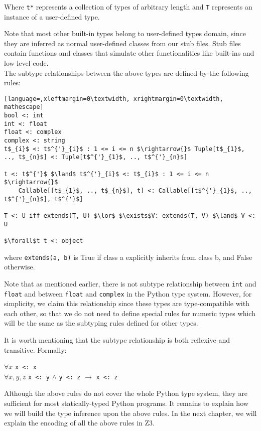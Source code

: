 Where \lstinline|t*| represents a collection of types of arbitrary length and \lstinline|T| represents an instance of a user-defined type.

Note that most other built-in types belong to user-defined types domain, since they are inferred as normal user-defined classes from our stub files. Stub files contain functions and classes that simulate other functionalities like built-ins and low level code. \\

The subtype relationships between the above types are defined by the following rules:

\begin{lstlisting}[language=,xleftmargin=0\textwidth, xrightmargin=0\textwidth, mathescape]
bool <: int
int <: float
float <: complex
complex <: string
t$_{i}$ <: t$^{'}_{i}$ : 1 <= i <= n $\rightarrow{}$ Tuple[t$_{1}$, .., t$_{n}$] <: Tuple[t$^{'}_{1}$, .., t$^{'}_{n}$]

t <: t$^{'}$ $\land$ t$^{'}_{i}$ <: t$_{i}$ : 1 <= i <= n $\rightarrow{}$
	Callable[[t$_{1}$, .., t$_{n}$], t] <: Callable[[t$^{'}_{1}$, .., t$^{'}_{n}$], t$^{'}$]
	
T <: U iff extends(T, U) $\lor$ $\exists$V: extends(T, V) $\land$ V <: U 
	
$\forall$t t <: object
\end{lstlisting}

where \lstinline|extends(a, b)| is True if class a explicitly inherits from class b,
and False otherwise.

Note that as mentioned earlier, there is not subtype relationship between \lstinline|int| and \lstinline|float| and between \lstinline|float| and \lstinline|complex| in the Python type system. However, for simplicity, we claim this relationship since these types are type-compatible with each other, so that we do not need to define special rules for numeric types which will be the same as the subtyping rules defined for other types.

It is worth mentioning that the subtype relationship is both reflexive and transitive. Formally:


\begin{center}
	$\forall x$ \lstinline|x <: x| \\
	$\forall x,y,z$ \lstinline|x <: y| $\land$ \lstinline|y <: z| $\rightarrow$ \lstinline|x <: z|
\end{center}

Although the above rules do not cover the whole Python type system, they are sufficient for most statically-typed Python programs. It remains to explain how we will build the type inference upon the above rules. In the next chapter, we will explain the encoding of all the above rules in Z3.
